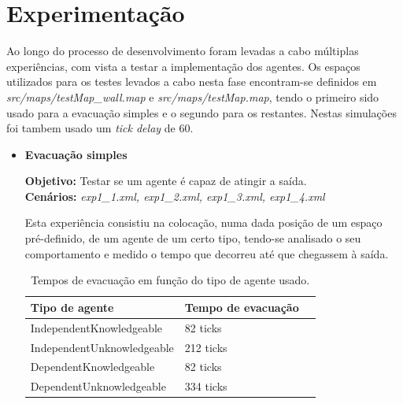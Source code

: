\documentclass[12pt]{article}
\begin{document}
\begin{titlepage}
\begin{itemize}
\end{itemize}

\newpage
\section{Experimentação}

Ao longo do processo de desenvolvimento foram levadas a cabo múltiplas experiências, com vista a testar a implementação dos agentes. Os espaços utilizados para os testes levados a cabo nesta fase encontram-se definidos em\textit{ src/maps/testMap\_wall.map} e \textit{ src/maps/testMap.map}, tendo o primeiro sido usado para a evacuação simples e o segundo para os restantes. Nestas simulações foi tambem usado um \textit{tick delay} de 60. 
\begin{itemize}
	
	
\item \textbf{Evacuação simples}

\textbf{Objetivo:} 
                                                                                                                                  	Testar se um agente é capaz de atingir a saída.
\\\textbf{Cenários:} 
\textit{exp1\_1.xml, exp1\_2.xml, exp1\_3.xml, exp1\_4.xml}
	
Esta experiência consistiu na colocação, numa dada posição de um espaço pré-definido, de um agente de um certo tipo, tendo-se analisado o seu comportamento e medido o tempo que decorreu até que chegassem à saída.

	
\setlength{\tabcolsep}{20pt}
\renewcommand{\arraystretch}{1.3}
\begin{table}[H]
	\centering
	\caption{Tempos de evacuação em função do tipo de agente usado.}
	\begin{tabular}{@{}lll@{}}
		\toprule
		\rowcolor[HTML]{FFFFFF} 
		\textbf{Tipo de agente}  & \textbf{Tempo de evacuação}\\
		\toprule
		\rowcolor[HTML]{FFFFFF} 
		IndependentKnowledgeable & 82 ticks \\ \midrule 
		\rowcolor[HTML]{FFFFFF} 
		IndependentUnknowledgeable & 212 ticks \\ \midrule 
		DependentKnowledgeable & 82 ticks \\ \midrule 
		DependentUnknowledgeable &
		334 ticks \\ \midrule 
	\end{tabular}
\end{table}
	

\end{itemize}
\end{titlepage}
\end{document}
